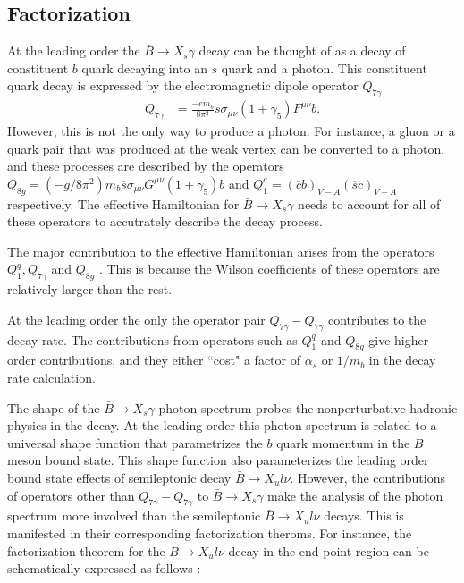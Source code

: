 \subsection{Factorization}
At the leading order the $\bar{B}\rightarrow X_s\gamma$ decay can be thought of as a decay of constituent $b$ quark decaying into an $s$ quark and a photon. This constituent quark decay is expressed by the electromagnetic dipole operator $Q_{7\gamma}$
\begin{eqnarray}
Q_{7\gamma} &= \frac{-e m_b}{8\pi^2}\bar s\sigma_{\mu\nu}(1+\gamma_5)F^{\mu\nu}b.
\end{eqnarray}
However, this is not the only way to produce a photon. For instance, a gluon or a quark pair that was produced at the weak vertex can be converted to a photon, and these processes are described by the operators $Q_{8 g}=\left(-g / 8 \pi^{2}\right) m_{b} \overline{s} \sigma_{\mu \nu} G^{\mu \nu}\left(1+\gamma_{5}\right) b$ and $Q_{1}^{c}=(\overline{c} b)_{V-A}(\overline{s} c)_{V-A}$ respectively. The effective Hamiltonian for $\bar{B}\rightarrow X_{s}\gamma$ needs to account for all of these operators to accutrately describe the decay process.\par
The major contribution to the effective Hamiltonian arises from the operators $Q_{1}^{q}, Q_{7\gamma}$ and $Q_{8g}$ \cite{Benzke:2010js}. This is because the Wilson coefficients of these operators are relatively larger than the rest.\par
At the leading order the only the operator pair $Q_{7\gamma}-Q_{7\gamma}$ contributes to the decay rate. The contributions from operators such as $Q_1^q$ and $Q_{8g}$ give higher order contributions, and they either ``cost" a factor of $\alpha_s$ or $1/m_{b}$ in the decay rate calculation.\par
The shape of the $\bar{B}\rightarrow X_s\gamma$ photon spectrum probes the nonperturbative hadronic physics in the decay. At the leading order this photon spectrum is related to a universal shape function that parametrizes the $b$ quark momentum in the $B$ meson bound state. This shape function also parameterizes the leading order bound state effects of semileptonic decay $\bar{B}\rightarrow X_u l \nu$. However, the contributions of operators other than $Q_{7\gamma}-Q_{7\gamma}$ to  $\bar{B}\rightarrow X_s\gamma$ make the analysis of the photon spectrum more involved than the semileptonic $\bar{B}\rightarrow X_u l \nu$ decays. This is manifested in their corresponding factorization theroms. For instance, the factorization theorem for the $\bar{B}\rightarrow X_u l \nu$ decay in the end point region can be schematically expressed as follows \cite{Korchemsky:1994jb, Bauer:2001yt, Bosch:2004th}:
